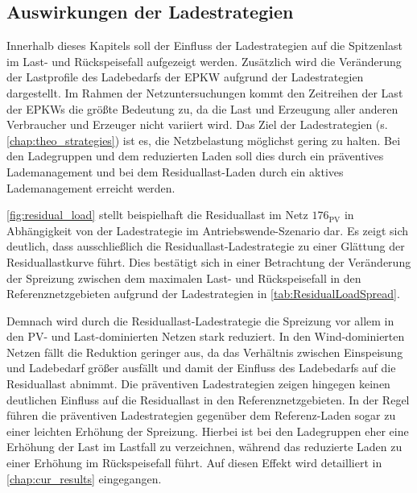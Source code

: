\subsection{Auswirkungen der Ladestrategien}\label{chap:results_charging_strategies}

Innerhalb dieses Kapitels soll der Einfluss der Ladestrategien auf die Spitzenlast im Last- und Rückspeisefall aufgezeigt werden.
Zusätzlich wird die Veränderung der Lastprofile des Ladebedarfs der \gls{EPKW} aufgrund der Ladestrategien dargestellt.
Im Rahmen der Netzuntersuchungen kommt den Zeitreihen der Last der \glspl{EPKW} die größte Bedeutung zu, da die Last und Erzeugung aller anderen Verbraucher und Erzeuger nicht variiert wird.
Das Ziel der Ladestrategien (s. \autoref{chap:theo_strategies}) ist es, die Netzbelastung möglichst gering zu halten.
Bei den Ladegruppen und dem reduzierten Laden soll dies durch ein präventives Lademanagement und bei dem Residuallast-Laden durch ein aktives Lademanagement erreicht werden.



\autoref{fig:residual_load} stellt beispielhaft die Residuallast im Netz \(176_{\text{PV}}\) in Abhängigkeit von der Ladestrategie im Antriebswende-Szenario dar.
Es zeigt sich deutlich, dass ausschließlich die Residuallast-Ladestrategie zu einer Glättung der Residuallastkurve führt.
Dies bestätigt sich in einer Betrachtung der Veränderung der Spreizung zwischen dem maximalen Last- und Rückspeisefall in den Referenznetzgebieten aufgrund der Ladestrategien in \autoref{tab:ResidualLoadSpread}.



Demnach wird durch die Residuallast-Ladestrategie die Spreizung vor allem in den \gls{PV}- und Last-dominierten Netzen stark reduziert.
In den Wind-dominierten Netzen fällt die Reduktion geringer aus, da das Verhältnis zwischen Einspeisung und Ladebedarf größer ausfällt und damit der Einfluss des Ladebedarfs auf die Residuallast abnimmt.
Die präventiven Ladestrategien zeigen hingegen keinen deutlichen Einfluss auf die Residuallast in den Referenznetzgebieten.
In der Regel führen die präventiven Ladestrategien gegenüber dem Referenz-Laden sogar zu einer leichten Erhöhung der Spreizung.
Hierbei ist bei den Ladegruppen eher eine Erhöhung der Last im Lastfall zu verzeichnen, während das reduzierte Laden zu einer Erhöhung im Rückspeisefall führt.
Auf diesen Effekt wird detailliert in \autoref{chap:cur_results} eingegangen.

